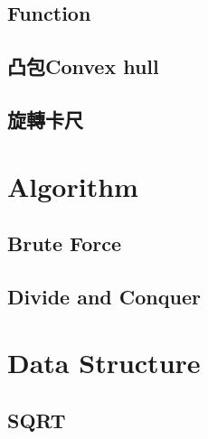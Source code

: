 \subsection{Function}


\clearpage

\subsection{凸包Convex hull}


\subsection{旋轉卡尺}


\section{Algorithm}

%

%

\subsection{Brute Force}


\subsection{Divide and Conquer}


\newpage

\section{Data Structure}

\subsection{SQRT}


